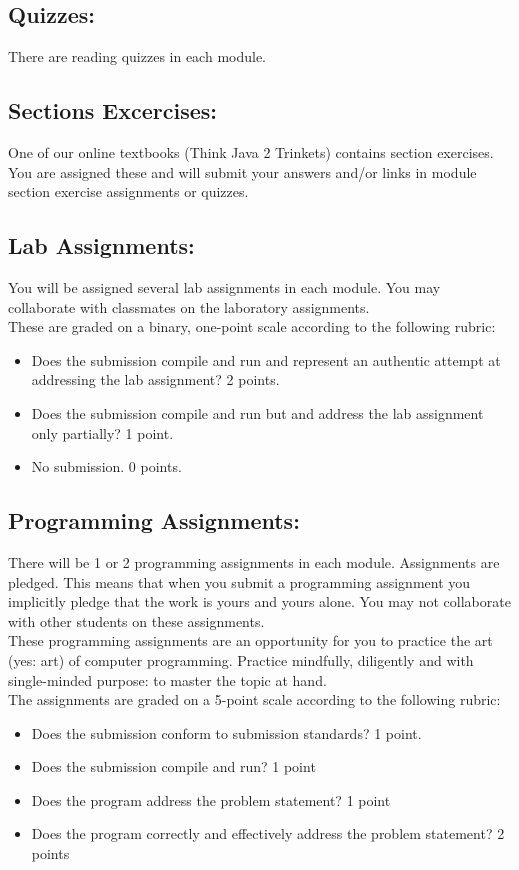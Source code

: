 \documentclass{article}
\begin{document}
\subsection{Quizzes:}

There are reading quizzes in each module.

\subsection{Sections Excercises:}

One of our online textbooks (Think Java 2 Trinkets) contains section exercises.  You are assigned these and will submit your answers and/or links in module section exercise assignments or quizzes.

\subsection{Lab Assignments:}

You will be assigned several lab assignments in each module. You may collaborate with classmates on the laboratory assignments.
\\
These are graded on a binary, one-point scale according to the following rubric:

\begin{itemize}
	\item Does the submission compile and run and represent an authentic attempt at addressing the lab assignment?  2 points.
	\item Does the submission compile and run but and address the lab assignment only partially?  1 point.
	\item No submission.  0 points.
\end{itemize}

\subsection{Programming Assignments:}

There will be 1 or 2 programming assignments in each module. Assignments are pledged.  This means that when you submit a programming assignment you implicitly pledge that the work is yours and yours alone. You may not collaborate with other students on these assignments.
\\
These programming assignments are an opportunity for you to practice the art (yes: art) of computer programming.  Practice mindfully, diligently and with single-minded purpose: to master the topic at hand.
\\
The assignments are graded on a 5-point scale according to the following rubric:
\\
\begin{itemize}
	\item Does the submission conform to submission standards?  1 point.
	\item Does the submission compile and run?  1 point
	\item Does the program address the problem statement? 1 point
	\item Does the program correctly and effectively address the problem statement?  2 points
\end{itemize}
\end{document}
